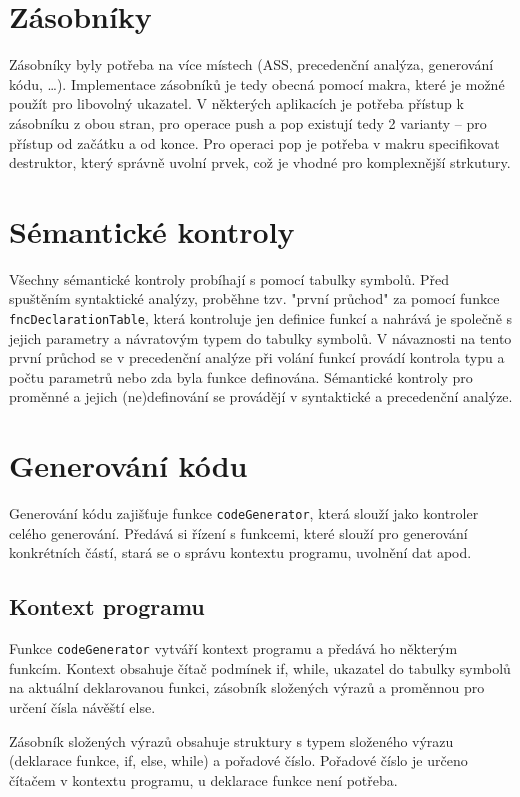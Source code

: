\documentclass[a4paper, 12pt]{article}
\begin{document}
    \section{Zásobníky} \label{zasobniky}
    Zásobníky byly potřeba na více místech (ASS, precedenční analýza, generování kódu, \ldots). Implementace zásobníků je tedy obecná pomocí makra, které je možné použít pro libovolný ukazatel. V některých aplikacích je potřeba přístup k zásobníku z obou stran, pro operace push a pop existují tedy 2 varianty -- pro přístup od začátku a od konce. Pro operaci pop je potřeba v makru specifikovat destruktor, který správně uvolní prvek, což je vhodné pro komplexnější strkutury.

    \section{Sémantické kontroly}
    Všechny sémantické kontroly probíhají s pomocí tabulky symbolů. Před spuštěním syntaktické analýzy, proběhne tzv. "první průchod" za pomocí funkce \texttt{fncDeclarationTable}, která kontroluje jen definice funkcí a nahrává je společně s jejich parametry a návratovým typem do tabulky symbolů. V návaznosti na tento první průchod se v precedenční analýze při volání funkcí provádí kontrola typu a počtu parametrů nebo zda byla funkce definována. Sémantické kontroly pro proměnné a jejich (ne)definování se provádějí v syntaktické a precedenční analýze.
    
    \section{Generování kódu} \label{generovani}
    Generování kódu zajišťuje funkce \texttt{codeGenerator}, která slouží jako kontroler celého generování. Předává si řízení s funkcemi, které slouží pro generování konkrétních částí, stará se o správu kontextu programu, uvolnění dat apod.

    \subsection{Kontext programu}
    Funkce \texttt{codeGenerator} vytváří kontext programu a předává ho některým funkcím. Kontext obsahuje čítač podmínek if, while, ukazatel do tabulky symbolů na aktuální deklarovanou funkci, zásobník složených výrazů a proměnnou pro určení čísla návěští else.

    Zásobník složených výrazů obsahuje struktury s typem složeného výrazu (deklarace funkce, if, else, while) a pořadové číslo. Pořadové číslo je určeno čítačem v kontextu programu, u deklarace funkce není potřeba.
\end{document}
